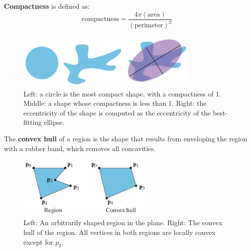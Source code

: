 \documentclass[a4paper,11pt]{article}
\begin{document}
\textbf{Compactness} is defined as:
\[
    \text{compactness} = \frac{4\pi (\text{area})}{(\text{perimeter})^2}
\]

\begin{figure}[H]
    \centering
    \includegraphics[width=0.8\textwidth]{images/compactness.png}
    \caption{
        Left: a circle is the most compact shape, with a compactness of 1.
        Middle: a shape whose compactness is less than 1.
        Right: the eccentricity of the shape is computed as the eccentricity of the best-fitting ellipse.
    }
\end{figure}

The \textbf{convex hull} of a region is the shape that results from enveloping the region with a rubber band, which removes all concavities.

\begin{figure}[H]
    \centering
    \includegraphics[width=0.6\textwidth]{images/convexhull.png}
    \caption{
        Left: An arbitrarily shaped region in the plane.
        Right: The convex hull of the region.
        All vertices in both regions are locally convex except for $p_2$.
    }
\end{figure}
\end{document}
